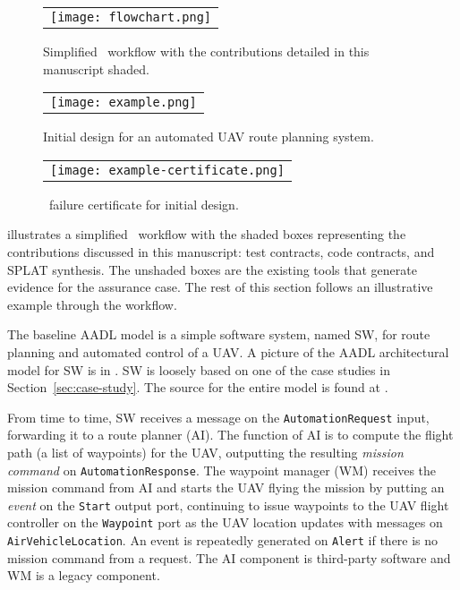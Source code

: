 \begin{figure*}
  \begin{center}
    \begin{tabular}{c}
      \texttt{[image: flowchart.png]} \\
    \end{tabular}
  \end{center}
\caption{Simplified \brfcs\ workflow with the contributions detailed in this manuscript shaded.}
\label{fig:flowchart}
\end{figure*}

\begin{figure*}[h]
  \begin{center}
    \begin{tabular}{c}
      \texttt{[image: example.png]}
    \end{tabular}
  \end{center}
\caption{Initial design for an automated UAV route planning system.}
\label{fig:example}
\end{figure*}

\begin{figure}
  \begin{center}
    \begin{tabular}{c}
      \texttt{[image: example-certificate.png]} \\
    \end{tabular}
  \end{center}
\caption{\agr\ failure certificate for initial design.}
\label{fig:example-certificate}
\end{figure}

 illustrates a simplified \brfcs\ workflow with the shaded boxes representing the contributions discussed in this manuscript: test contracts, code contracts, and SPLAT synthesis.
The unshaded boxes are the existing tools that generate evidence for the assurance case.
The rest of this section follows an illustrative example through the workflow.

The baseline AADL model is a simple software system, named SW, for route planning
and automated control of a UAV. A picture of the AADL architectural
model for SW is in . SW is loosely based on one of
the case studies in Section~\ref{sec:case-study}.  The source for the
entire model is found at \cite{repo}.

From time to time, SW receives a message on the \texttt{AutomationRequest} input,
forwarding it to a route planner (AI). The function of AI is to 
compute the flight path (a list of waypoints) for the UAV, outputting
the resulting \emph{mission command} on \texttt{AutomationResponse}.
The waypoint manager (WM) receives the mission command from AI and
starts the UAV flying the mission by putting an \emph{event} on the
\texttt{Start} output port, continuing to issue waypoints to the UAV
flight controller on the \texttt{Waypoint} port as the UAV location
updates with messages on \texttt{AirVehicleLocation}.
An event is repeatedly generated on \texttt{Alert} if there is no
mission command from a request. The AI component is third-party
software and WM is a legacy component.

